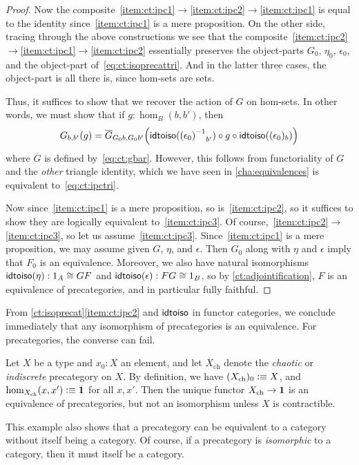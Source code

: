 \begin{proof}
  Now the composite~\ref{item:ct:ipc1}$\to$\ref{item:ct:ipc2}$\to$\ref{item:ct:ipc1} is equal to the identity since~\ref{item:ct:ipc1} is a mere proposition.
  On the other side, tracing through the above constructions we see that the composite~\ref{item:ct:ipc2}$\to$\ref{item:ct:ipc1}$\to$\ref{item:ct:ipc2} essentially preserves the object-parts $G_0$, $\eta_0$, $\epsilon_0$, and the object-part of~\eqref{eq:ct:isoprecattri}.
  And in the latter three cases, the object-part is all there is, since hom-sets are sets.

  Thus, it suffices to show that we recover the action of $G$ on hom-sets.
  In other words, we must show that if $g:\hom_B(b,b')$, then
  \[ G_{b,b'}(g) =
  \overline{G}_{G_0b,G_0b'}\Big(\mathsf{idtoiso}(\mathord{{(\epsilon_0)}^{-1}}_{b'}) \circ g \circ \mathsf{idtoiso}((\epsilon_0)_b)\Big)
  \]
  where $\overline{G}$ is defined by~\eqref{eq:ct:gbar}.
  However, this follows from functoriality of $G$ and the \emph{other} triangle identity, which we have seen in \cref{cha:equivalences} is equivalent to~\eqref{eq:ct:ipctri}.

  Now since~\ref{item:ct:ipc1} is a mere proposition, so is~\ref{item:ct:ipc2}, so it suffices to show they are logically equivalent to~\ref{item:ct:ipc3}.
  Of course,~\ref{item:ct:ipc2}$\to$\ref{item:ct:ipc3}, so let us assume~\ref{item:ct:ipc3}.
  Since~\ref{item:ct:ipc1} is a mere proposition, we may assume given $G$, $\eta$, and $\epsilon$.
  Then $G_0$ along with $\eta$ and $\epsilon$ imply that $F_0$ is an equivalence.
  Moreover, we also have natural isomorphisms $\mathsf{idtoiso}(\eta):1_A\cong GF$ and $\mathsf{idtoiso}(\epsilon):FG\cong 1_B$, so by \cref{ct:adjointification}, $F$ is an equivalence of precategories, and in particular fully faithful.
\end{proof}

From \cref{ct:isoprecat}\ref{item:ct:ipc2} and $\mathsf{idtoiso}$ in functor categories, we conclude immediately that any isomorphism of precategories is an equivalence.
For precategories, the converse can fail.

\begin{eg}\label{ct:chaotic}
  Let $X$ be a type and $x_0:X$ an element, and let $X_{\mathrm{ch}}$ denote the \emph{chaotic} or \emph{indiscrete} precategory on $X$.
  By definition, we have $(X_{\mathrm{ch}})_0\vcentcolon\equiv X$, and $\hom_{X_{\mathrm{ch}}}(x,x') \vcentcolon\equiv \mathbf{1}$ for all $x,x'$.
  Then the unique functor $X_{\mathrm{ch}}\to \mathbf{1}$ is an equivalence of precategories, but not an isomorphism unless $X$ is contractible.

  This example also shows that a precategory can be equivalent to a category without itself being a category.
  Of course, if a precategory is \emph{isomorphic} to a category, then it must itself be a category.
\end{eg}

